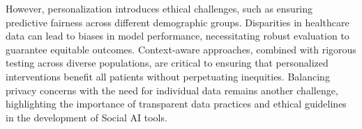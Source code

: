 However, personalization introduces ethical challenges, such as ensuring predictive fairness across different demographic groups. Disparities in healthcare data can lead to biases in model performance, necessitating robust evaluation to guarantee equitable outcomes. Context-aware approaches, combined with rigorous testing across diverse populations, are critical to ensuring that personalized interventions benefit all patients without perpetuating inequities. Balancing privacy concerns with the need for individual data remains another challenge, highlighting the importance of transparent data practices and ethical guidelines in the development of Social AI tools.

